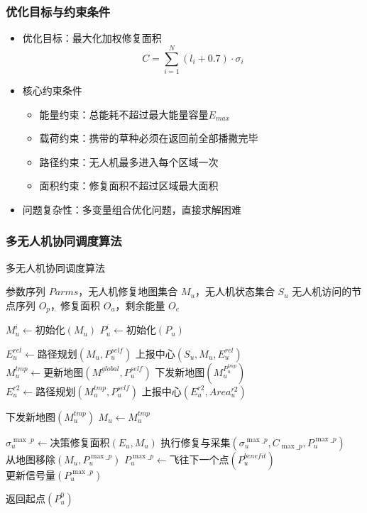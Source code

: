 \documentclass[9pt, aspectratio=169]{beamer}  %
\begin{document}
\begin{frame}
	\frametitle{优化目标与约束条件}
	\begin{itemize}
		\item 优化目标：最大化加权修复面积
		      \begin{equation*}
			      C = \sum_{i=1}^{N} (l_i + 0.7) \cdot \sigma_i
		      \end{equation*}
		\item 核心约束条件
		      \begin{itemize}
			      \item 能量约束：总能耗不超过最大能量容量$E_{max}$
			      \item 载荷约束：携带的草种必须在返回前全部播撒完毕
			      \item 路径约束：无人机最多进入每个区域一次
			      \item 面积约束：修复面积不超过区域最大面积
		      \end{itemize}
		\item 问题复杂性：多变量组合优化问题，直接求解困难
	\end{itemize}
\end{frame}

\begin{frame}
	\frametitle{多无人机协同调度算法}
	\begin{algorithm}[H]
		\scriptsize %
		\caption{多无人机协同调度算法}
		\label{alg:multi_uav_scheduling}
		\begin{algorithmic}[1]
			\Require 参数序列 $Parms$，无人机修复地图集合 $M_u$，无人机状态集合 $S_u$
			\Ensure 无人机访问的节点序列 $O_p$，修复面积 $O_a$，剩余能量 $O_e$

			\State $M_u^i \gets \text{初始化}(M_u)$ 
			\State $P_u^i \gets \text{初始化}(P_u)$ 

				\State $E_u^{rel} \gets \text{路径规划}(M_u, P_u^{self})$ 
				\State $\text{上报中心}(S_u, M_u, E_u^{rel})$ 
				\State $M_u^{tmp} \gets \text{更新地图}(M^{global}, P_u^{self})$
				\State $\text{下发新地图}(M_u^{P_u^{tmp}})$ 
				\State $E_u^{r2} \gets \text{路径规划}(M_u^{tmp}, P_u^{self})$ 
				\State $\text{上报中心}(E_u^{r2}, Area_u^{r2})$

					\State $\text{下发新地图}(M_u^{tmp})$ 
					\State $M_u \gets M_u^{tmp}$
				\EndIf

				\State $\sigma_u^{\max\_p} \gets \text{决策修复面积}(E_u, M_u)$ 
				\State $\text{执行修复与采集}(\sigma_u^{\max\_p}, C_{\max\_p}, P_u^{\max\_p})$
				\State $\text{从地图移除}(M_u, P_u^{\max\_p})$
				\State $P_u^{\max\_p} \gets \text{飞往下一个点}(P_u^{benefit})$
				\State $\text{更新信号量}(P_u^{\max\_p})$
			\EndWhile

			\State $\text{返回起点}(P_u^0)$ 
		\end{algorithmic}
	\end{algorithm}
\end{frame}
\end{document}
